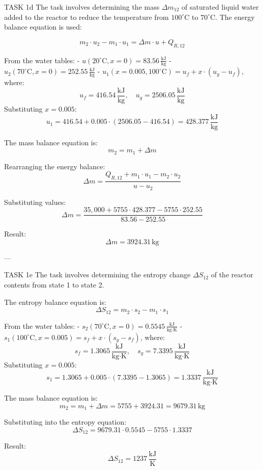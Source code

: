 TASK 1d  
The task involves determining the mass \( \Delta m_{12} \) of saturated liquid water added to the reactor to reduce the temperature from \( 100^\circ\text{C} \) to \( 70^\circ\text{C} \). The energy balance equation is used:  

\[
m_2 \cdot u_2 - m_1 \cdot u_1 = \Delta m \cdot u + Q_{R,12}
\]

From the water tables:  
- \( u(20^\circ\text{C}, x=0) = 83.56 \, \frac{\text{kJ}}{\text{kg}} \)  
- \( u_2(70^\circ\text{C}, x=0) = 252.55 \, \frac{\text{kJ}}{\text{kg}} \)  
- \( u_1(x=0.005, 100^\circ\text{C}) = u_f + x \cdot (u_g - u_f) \), where:  
  \[
  u_f = 416.54 \, \frac{\text{kJ}}{\text{kg}}, \quad u_g = 2506.05 \, \frac{\text{kJ}}{\text{kg}}
  \]
  Substituting \( x = 0.005 \):  
  \[
  u_1 = 416.54 + 0.005 \cdot (2506.05 - 416.54) = 428.377 \, \frac{\text{kJ}}{\text{kg}}
  \]

The mass balance equation is:  
\[
m_2 = m_1 + \Delta m
\]

Rearranging the energy balance:  
\[
\Delta m = \frac{Q_{R,12} + m_1 \cdot u_1 - m_2 \cdot u_2}{u - u_2}
\]

Substituting values:  
\[
\Delta m = \frac{35,000 + 5755 \cdot 428.377 - 5755 \cdot 252.55}{83.56 - 252.55}
\]

Result:  
\[
\Delta m = 3924.31 \, \text{kg}
\]

---

TASK 1e  
The task involves determining the entropy change \( \Delta S_{12} \) of the reactor contents from state 1 to state 2.  

The entropy balance equation is:  
\[
\Delta S_{12} = m_2 \cdot s_2 - m_1 \cdot s_1
\]

From the water tables:  
- \( s_2(70^\circ\text{C}, x=0) = 0.5545 \, \frac{\text{kJ}}{\text{kg·K}} \)  
- \( s_1(100^\circ\text{C}, x=0.005) = s_f + x \cdot (s_g - s_f) \), where:  
  \[
  s_f = 1.3065 \, \frac{\text{kJ}}{\text{kg·K}}, \quad s_g = 7.3395 \, \frac{\text{kJ}}{\text{kg·K}}
  \]
  Substituting \( x = 0.005 \):  
  \[
  s_1 = 1.3065 + 0.005 \cdot (7.3395 - 1.3065) = 1.3337 \, \frac{\text{kJ}}{\text{kg·K}}
  \]

The mass balance equation is:  
\[
m_2 = m_1 + \Delta m = 5755 + 3924.31 = 9679.31 \, \text{kg}
\]

Substituting into the entropy equation:  
\[
\Delta S_{12} = 9679.31 \cdot 0.5545 - 5755 \cdot 1.3337
\]

Result:  
\[
\Delta S_{12} = 1237 \, \frac{\text{kJ}}{\text{K}}
\]